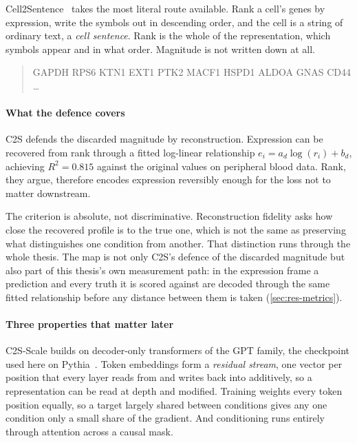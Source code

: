 \noindent
Cell2Sentence~\cite{c2s} takes the most literal route available. Rank a cell's
genes by expression, write the symbols out in descending order, and the cell is a
string of ordinary text, a \emph{cell sentence}. Rank is the whole of the
representation, which symbols appear and in what order. Magnitude is not written
down at all.

\begin{quote}
\ttfamily\small
GAPDH RPS6 KTN1 EXT1 PTK2 MACF1 HSPD1 ALDOA GNAS CD44 \dots
\end{quote}

\paragraph{What the defence covers} C2S defends the discarded magnitude by
reconstruction. Expression can be recovered from rank through a fitted
log-linear relationship $e_i = a_d\log(r_i) + b_d$, achieving $R^2 = 0.815$
against the original values on peripheral blood data. Rank, they argue,
therefore encodes expression reversibly enough for the loss not to matter
downstream.

The criterion is absolute, not discriminative. Reconstruction fidelity asks how
close the recovered profile is to the true one, which is not the same as
preserving what distinguishes one condition from another. That distinction runs
through the whole thesis. The map is not only C2S's defence of the discarded
magnitude but also part of this thesis's own measurement path: in the expression
frame a prediction and every truth it is scored against are decoded through the
same fitted relationship before any distance between them is taken
(\cref{sec:res-metrics}).

\paragraph{Three properties that matter later}
C2S-Scale builds on decoder-only transformers of the GPT family, the checkpoint
used here on Pythia~\cite{pythia}. Token embeddings form a \emph{residual
stream}, one vector per position that every layer reads from and writes back into
additively, so a representation can be read at depth and
modified. Training weights every token position equally, so a target largely
shared between conditions gives any one condition only a small share of the
gradient. And conditioning runs entirely through attention across a causal mask.

